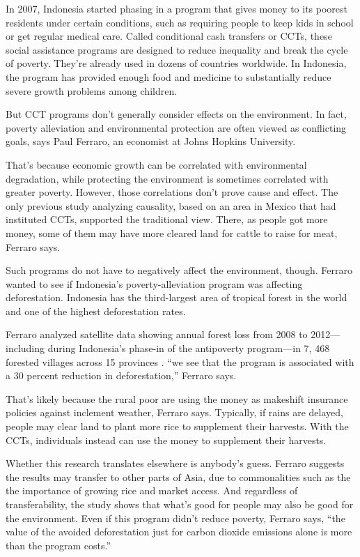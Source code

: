 In 2007, Indonesia started phasing in a program that gives money to its
poorest residents under certain conditions, such as requiring people to
keep kids in school or get regular medical care. Called conditional cash
transfers or CCTs, these social assistance programs are designed to
reduce inequality and break the cycle of poverty. They're already used
in dozens of countries worldwide. In Indonesia, the program has provided
enough food and medicine to substantially reduce severe growth problems
among children.

But CCT programs don't generally consider effects on the environment. In
fact, poverty alleviation and environmental protection are often viewed
as conflicting goals, says Paul Ferraro, an economist at Johns Hopkins
University.

That's because economic growth can be correlated with environmental
degradation, while protecting the environment is sometimes correlated
with greater poverty. However, those correlations don't prove cause and
effect. The only previous study analyzing causality, based on an area in
Mexico that had instituted CCTs, supported the traditional view. There,
as people got more money, some of them may have more cleared land for
cattle to raise for meat, Ferraro says.

Such programs do not have to negatively affect the environment, though.
Ferraro wanted to see if Indonesia's poverty-alleviation program was
affecting deforestation. Indonesia has the third-largest area of
tropical forest in the world and one of the highest deforestation rates.

Ferraro analyzed satellite data showing annual forest loss from 2008 to
2012---including during Indonesia's phase-in of the antipoverty
program---in 7, 468 forested villages across 15 provinces . 
 ``we see that the program is
associated with a 30 percent reduction in deforestation,'' Ferraro says.

That's likely because the rural poor are using the money as makeshift
insurance policies against inclement weather, Ferraro says. Typically,
if rains are delayed, people may clear land to plant more rice to
supplement their harvests. With the CCTs, individuals instead can use
the money to supplement their harvests.

Whether this research translates elsewhere is anybody's guess. Ferraro
suggests
the results may transfer to other parts of Asia, due to
commonalities such as the
 the importance of growing rice and market access. And
regardless of transferability, the study shows that what's good for
people may also be good for 
 the environment. Even if this program didn't
reduce poverty, Ferraro says, ``the value of the avoided deforestation just for
carbon dioxide emissions alone is more than the program costs.''


